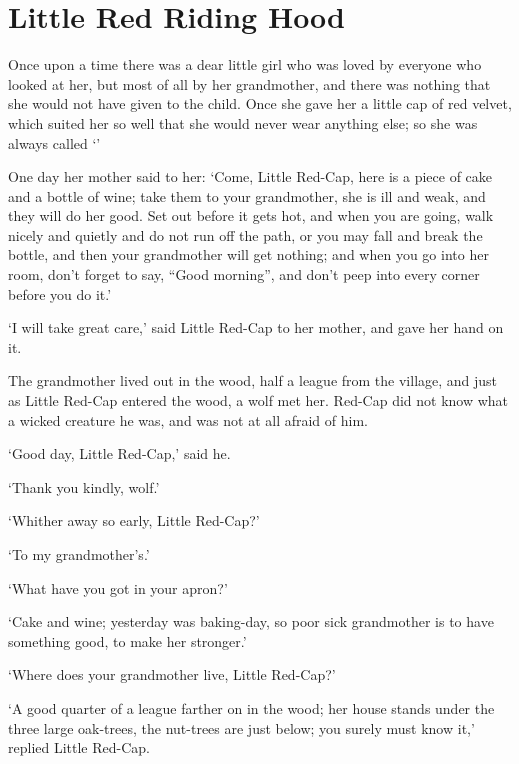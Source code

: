 
\chapter{Little Red Riding Hood}


Once upon a time there was a dear little girl who was loved by everyone who looked at her, but most of all by her grandmother, and there was nothing that she would not have given to the child. Once she gave her a little cap of red velvet, which suited her so well that she would never wear anything else; so she was always called `'

One day her mother said to her: `Come, Little Red-Cap, here is a piece of cake and a bottle of wine; take them to your grandmother, she is ill and weak, and they will do her good. Set out before it gets hot, and when you are going, walk nicely and quietly and do not run off the path, or you may fall and break the bottle, and then your grandmother will get nothing; and when you go into her room, don't forget to say, ``Good morning'', and don't peep into every corner before you do it.'

`I will take great care,' said Little Red-Cap to her mother, and gave her hand on it.

The grandmother lived out in the wood, half a league from the village, and just as Little Red-Cap entered the wood, a wolf met her. Red-Cap did not know what a wicked creature he was, and was not at all afraid of him.

`Good day, Little Red-Cap,' said he.

`Thank you kindly, wolf.'

`Whither away so early, Little Red-Cap?'

`To my grandmother's.'

`What have you got in your apron?'

`Cake and wine; yesterday was baking-day, so poor sick grandmother is to have something good, to make her stronger.'

`Where does your grandmother live, Little Red-Cap?'

`A good quarter of a league farther on in the wood; her house stands under the three large oak-trees, the nut-trees are just below; you surely must know it,' replied Little Red-Cap.

